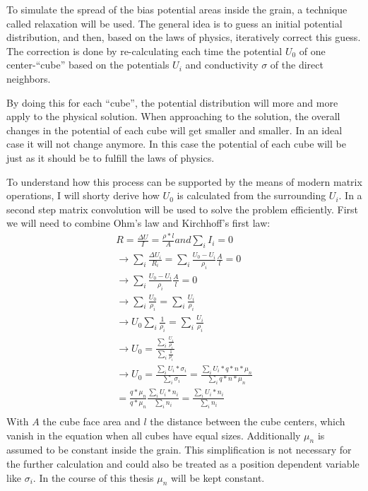 \documentclass[11pt]{article}
\begin{document}
To simulate the spread of the bias potential areas inside the grain, a
technique called relaxation will be used. The general idea is to guess
an initial potential distribution, and then, based on the laws of
physics, iteratively correct this guess. The correction is done by
re-calculating each time the potential \(U_0\) of one center-``cube''
based on the potentials \(U_i\) and conductivity \(\sigma\) of the
direct neighbors.

By doing this for each ``cube'', the potential distribution will more
and more apply to the physical solution. When approaching to the
solution, the overall changes in the potential of each cube will get
smaller and smaller. In an ideal case it will not change anymore. In
this case the potential of each cube will be just as it should be to
fulfill the laws of physics.

To understand how this process can be supported by the means of modern
matrix operations, I will shorty derive how \(U_0\) is calculated from
the surrounding \(U_i\). In a second step matrix convolution will be
used to solve the problem efficiently. First we will need to combine
Ohm's law and Kirchhoff's first law: \begin{align}
R  = \frac{\Delta U}{I} = \frac{{\rho}*l}{A} and \sum_{i}I_i=0\\
\rightarrow \sum_{i}\frac{\Delta U_i}{R_i} = \sum_{i}\frac{U_0-U_i}{\rho_i}\frac{A}{l}=0\\
\rightarrow \sum_{i}\frac{U_0-U_i}{\rho_i}\frac{A}{l}=0\\
\rightarrow \sum_{i}\frac{U_0}{\rho_i}=\sum_{i}\frac{U_i}{\rho_i}\\
\rightarrow U_0\sum_{i}\frac{1}{\rho_i}=\sum_{i}\frac{U_i}{\rho_i}\\
\rightarrow U_0=\frac{\sum_{i}\frac{U_i}{\rho_i}}{\sum_{i}\frac{1}{\rho_i}}\\
\rightarrow U_0=\frac{\sum_{i}{U_i*\sigma_i}}{\sum_{i}{\sigma_i}}=\frac{\sum_{i}{U_i*q*n*\mu_n }}{\sum_{i}{q*n*\mu_n }}\\=\frac{q*\mu_n}{q*\mu_n} \frac{\sum_{i}{U_i*n_i}}{\sum_{i}{n_i}}=\frac{\sum_{i}{U_i*n_i}}{\sum_{i}{n_i}}\label{u_center}\tag{$U_0$ from $U_i$}\\
\end{align} With \(A\) the cube face area and \(l\) the distance between
the cube centers, which vanish in the equation when all cubes have equal
sizes. Additionally \(\mu_n\) is assumed to be constant inside the
grain. This simplification is not necessary for the further calculation
and could also be treated as a position dependent variable like
\(\sigma_i\). In the course of this thesis \(\mu_n\) will be kept
constant.
\end{document}
